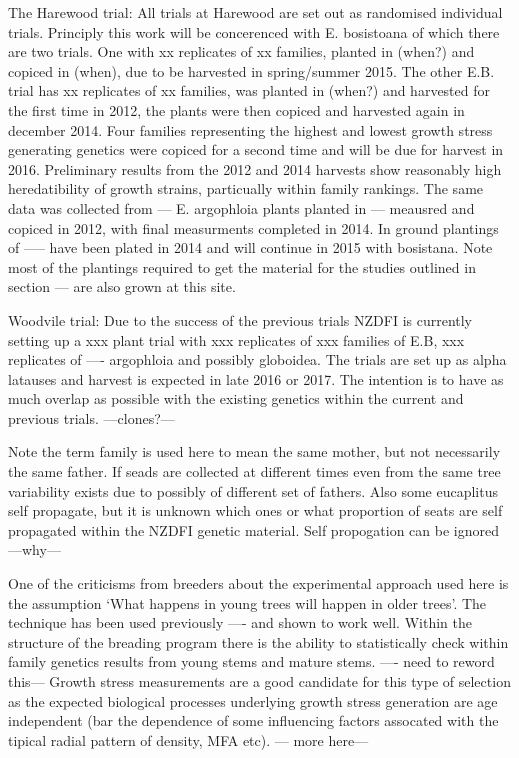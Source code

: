 \documentclass{article}
\begin{document}
The Harewood trial:
All trials at Harewood are set out as randomised individual trials.
Principly this work will be concerenced with E. bosistoana of which there are
two trials. One with xx replicates of xx families, planted in (when?) and
copiced in (when), due to be harvested in spring/summer 2015. The other E.B.
trial has xx replicates of xx families, was planted in (when?) and harvested for
the first time in 2012, the plants were then copiced and harvested again in
december 2014. Four families representing the highest and lowest growth stress
generating genetics were copiced for a second time and will be due for harvest
in 2016. Preliminary results from the 2012 and 2014 harvests show reasonably high
heredatibility of growth strains, particually within family rankings. The same
data was collected from --- E. argophloia plants planted in --- meausred and
copiced in 2012, with final measurments completed in 2014.  In ground plantings
of ----- have been plated in 2014 and will continue in 2015 with bosistana. Note
most of the plantings required to get the material for the studies outlined in
section --- are also grown at this site.

Woodvile trial:
Due to the success of the previous trials NZDFI is currently setting up a xxx
plant trial with xxx replicates of xxx families of E.B, xxx replicates of ----
argophloia and possibly globoidea. The trials are set up as alpha latauses and
harvest is expected in late 2016 or 2017. The intention is to have as much
overlap as possible with the existing genetics within the current and previous
trials. ---clones?---


Note the term family is used here to mean the same mother, but not necessarily
the same father. If seads are collected at different times even from the same
tree variability exists due to possibly of different set of fathers. Also some
eucaplitus self propagate, but it is unknown which ones or what proportion of
seats are self propagated within the NZDFI genetic material. Self propogation
can be ignored ---why---

One of the criticisms from breeders about the experimental approach used here is
the assumption `What happens in young trees will happen in older trees'. The
technique has been used previously ---- and shown to work well. Within the
structure of the breading program there is the ability to statistically check
within family genetics results from young stems and mature stems. ---- need to
reword this--- Growth stress measurements are a good candidate for this type of
selection as the expected biological processes underlying growth stress
generation are age independent (bar the dependence of some influencing
factors assocated with the tipical radial pattern of density, MFA etc). --- more
here---
\end{document}
